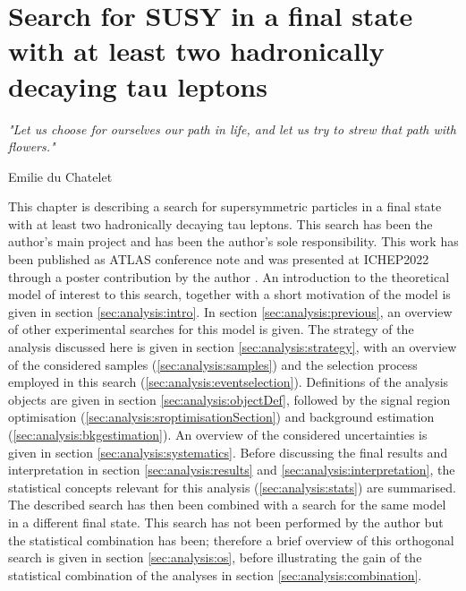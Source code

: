 \chapter{Search for SUSY in a final state with at least two hadronically decaying tau leptons}
\label{ch:analysis}
\epigraph{\emph{"Let us choose for ourselves our path in life, and let us try to strew that path with flowers."}}{Emilie du Chatelet}



This chapter is describing a search for supersymmetric particles in a final state with at least two hadronically decaying tau leptons.  This search has been the author's main project and has been the author's sole responsibility.  This work has been published as \ac{ATLAS} conference note \cite{AnalysisConf} and was presented at ICHEP2022 through a poster contribution by the author \cite{ICHEP2022Poster}.
An introduction to the theoretical model of interest to this search, together with a short motivation of the model is given in section \ref{sec:analysis:intro}.  In section \ref{sec:analysis:previous}, an overview of other experimental searches for this model is given.  The strategy of the analysis discussed here is given in section \ref{sec:analysis:strategy},  with an overview of the considered samples (\ref{sec:analysis:samples}) and the selection process employed in this search (\ref{sec:analysis:eventselection}).  Definitions of the analysis objects are given in section \ref{sec:analysis:objectDef}, followed by the signal region optimisation (\ref{sec:analysis:sroptimisationSection}) and  background estimation (\ref{sec:analysis:bkgestimation}).  An overview of the considered uncertainties is given in section \ref{sec:analysis:systematics}.  Before discussing the final results and interpretation in section \ref{sec:analysis:results} and \ref{sec:analysis:interpretation},  the statistical concepts relevant for this analysis (\ref{sec:analysis:stats}) are summarised.   
The described search has then been combined with a search for the same model in a different final state.  This search has not been performed by the author but the statistical combination has been; therefore a brief overview of this orthogonal search is given in section \ref{sec:analysis:os}, before illustrating the gain of the statistical combination of the analyses in section \ref{sec:analysis:combination}.

